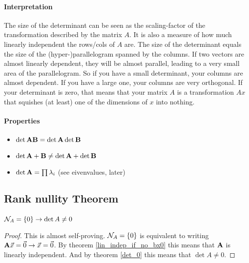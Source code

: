 \paragraph{Interpretation} The size of the determinant can be seen as the scaling-factor of the transformation described by the matrix $A$.
It is also a measure of how much linearly independent the rows/cols of $A$ are. The size of the determinant equals the size of the (hyper-)parallelogram spanned by the columns. If two vectors are almost linearly dependent, they will be almost parallel, leading to a very small area of the parallelogram. So if you have a small determinant, your columns are almost dependent. If you have a large one, your columns are very orthogonal. 
If your determinant is zero, that means that your matrix $A$ is a transformation $Ax$ that squishes (at least) one of the dimensions of $x$ into nothing.


\paragraph{Properties}
\begin{itemize}
    \item $\det{\ensuremath{\mathbf{A}} \ensuremath{\mathbf{B}}} = \det{\ensuremath{\mathbf{A}}}\det{\ensuremath{\mathbf{B}}}$
    \item $\det{\ensuremath{\mathbf{A}} + \ensuremath{\mathbf{B}}} \neq \det{\ensuremath{\mathbf{A}}} + \det{\ensuremath{\mathbf{B}}}$
    \item $\det{\ensuremath{\mathbf{A}}} = \prod{\lambda_i}$ (see eivenvalues, later)
\end{itemize}









\subsection{Rank nullity Theorem}


\begin{theorem}
    $ \mathcal{N}_{A} = \{ 0 \} \to \det{A} \neq 0 $
\end{theorem}
\begin{proof}
    This is almost self-proving. 
    $\mathcal{N}_{A} = \{ 0 \}$ is equivalent to writing $\mathbf{A} \vec{x} = \vec{0} \to \vec{x} = \vec{0}$.
    By theorem \ref{lin_indep_if_no_bx0} this means that $\mathbf{A}$ is linearly independent.
    And by theorem \ref{det_0} this means that $ \det{A} \neq 0 $.
\end{proof}


